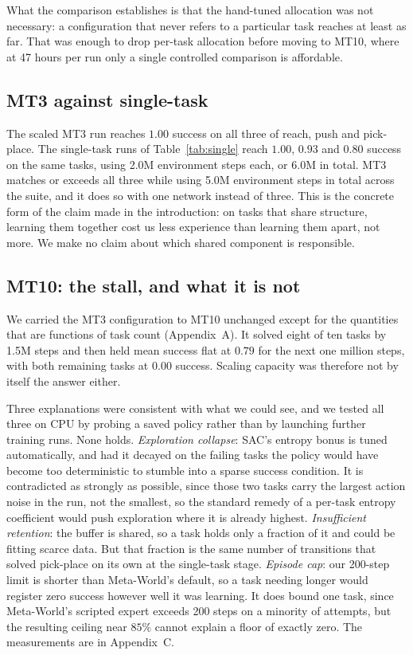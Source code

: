 \documentclass[letterpaper, 10 pt, conference]{ieeeconf}
\begin{document}
What the comparison establishes is that the hand-tuned allocation was not necessary: a
configuration that never refers to a particular task reaches at least as far. That was enough
to drop per-task allocation before moving to MT10, where at 47 hours per run only a single
controlled comparison is affordable.

\subsection{MT3 against single-task}
\label{sec:mt3vs1}

The scaled MT3 run reaches $1.00$ success on all three of reach, push and pick-place. The
single-task runs of Table~\ref{tab:single} reach $1.00$, $0.93$ and $0.80$ success on the
same tasks, using 2.0M environment steps each, or 6.0M in total. MT3 matches or
exceeds all three while using
5.0M environment steps in total across the suite, and it does so with one network instead of
three. This is the concrete form of the claim made in the introduction: on tasks that share
structure, learning them together cost us less experience than learning them apart, not more.
We make no claim about which shared component is responsible.

\subsection{MT10: the stall, and what it is not}
\label{sec:mt10stall}

We carried the MT3 configuration to MT10 unchanged except for the quantities that are
functions of task count (Appendix~A). It solved eight of ten tasks by 1.5M steps
and then held mean success flat at $0.79$ for the next one million steps, with both remaining
tasks at $0.00$ success. Scaling capacity was therefore not by itself the answer either.

Three explanations were consistent with what we could see, and we tested all three on CPU
by probing a saved policy rather than by launching further training runs. None holds.
\emph{Exploration collapse}: SAC's entropy bonus is tuned automatically, and had it decayed on
the failing tasks the policy would have become too deterministic to stumble into a sparse
success condition. It is contradicted as strongly as possible, since those two tasks carry the
largest action noise in the run, not the smallest, so the standard remedy of a per-task entropy
coefficient would push exploration where it is already highest. \emph{Insufficient retention}:
the buffer is shared, so a task holds only a fraction of it and could be fitting scarce data.
But that fraction is the same number of transitions that solved pick-place on its own at the
single-task stage. \emph{Episode cap}: our 200-step limit is shorter than Meta-World's default,
so a task needing longer would register zero success however well it was learning. It does bound
one task, since Meta-World's scripted expert exceeds 200 steps on a minority of attempts, but
the resulting ceiling near $85\%$ cannot explain a floor of exactly zero. The measurements are
in Appendix~C.
\end{document}
